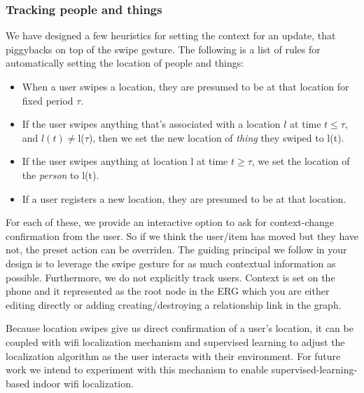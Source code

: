\subsubsection{Tracking people and things}
\label{sec:tracking}

We have designed a few heuristics for setting the context for an update, that piggybacks on top of the swipe gesture.
The following is a list of rules for automatically setting the location of people and things:

\begin{itemize}
\item When a user swipes a location, they are presumed to be at that location for fixed period $\tau$.
\item If the user swipes anything that's associated with a location $l$ at time $t \le \tau$, and $l(t)\ne$l($\tau$), 
		then we set the new location of \emph{thing} they swiped to l(t).
\item If the user swipes anything at location l at time $t \ge \tau$, we set the location of the \emph{person} to l(t).
\item If a user registers a new location, they are presumed to be at that location.
\end{itemize}

For each of these, we provide an interactive option to ask for context-change confirmation from the user.  So if we think the
user/item has moved but they have not, the preset action can be overriden.  The guiding principal we follow in your design
is to leverage the swipe gesture for as much contextual information as possible.  Furthermore, we do not explicitly track users.
Context is set on the phone and it represented as the root node in the ERG which you are either editing directly or
adding creating/destroying a relationship link in the graph.

Because location swipes give us direct confirmation of a user's location, it can be coupled with wifi localization mechanism and
supervised learning to adjust the localization algorithm as the user interacts with their environment. 
For future work we intend to experiment with this mechanism to enable supervised-learning-based indoor wifi localization.


